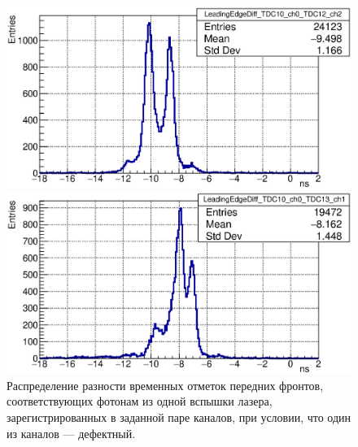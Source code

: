 \begin{figure}[H]
\begin{minipage}[b]{0.495\textwidth}
\includegraphics[width=1.0\textwidth]{pictures/23_LeadingEdgeDiff_TDC10_ch0_TDC12_ch2_feb2017.eps}
\end{minipage}
\hspace{0.01\textwidth}
\begin{minipage}[b]{0.495\textwidth}
\includegraphics[width=1.0\textwidth]{pictures/23_LeadingEdgeDiff_TDC10_ch0_TDC13_ch1_feb2017.eps}
\end{minipage}
\caption{Распределение разности временных отметок передних фронтов, соответствующих фотонам из одной вспышки лазера, зарегистрированных в заданной паре каналов, при условии, что один из каналов --- дефектный.}
\label{fig:LeadingEdgeDiffMultiplePeaks}
\end{figure}


